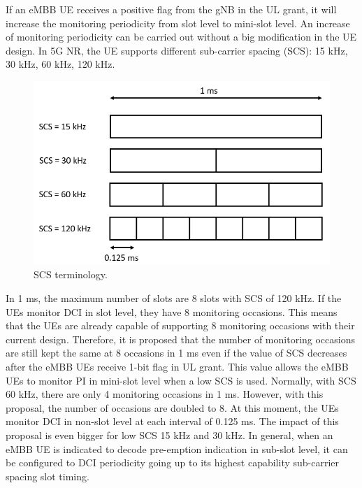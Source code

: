 \documentclass{ieeeaccess}
\begin{document}
If an eMBB UE receives a positive flag from the gNB in the UL grant, it will increase the monitoring periodicity from slot level to mini-slot level. An increase of monitoring periodicity can be carried out without a big modification in the UE design. In 5G NR, the UE supports different sub-carrier spacing (SCS): 15 kHz, 30 kHz, 60 kHz, 120 kHz. 

\begin{figure}[htbp]
\centerline{\includegraphics[scale=0.3]{fig9.PNG}}
\caption{SCS terminology.}
\label{fig9}
\vspace{-2mm}
\end{figure}

In 1 ms, the maximum number of slots are 8 slots with SCS of 120 kHz. If the UEs monitor DCI in slot level, they have 8 monitoring occasions. This means that the UEs are already capable of supporting 8 monitoring occasions with their current design. Therefore, it is proposed that the number of monitoring occasions are still kept the same at 8 occasions in 1 ms even if the value of SCS decreases after the eMBB UEs receive 1-bit flag in UL grant. This value allows the eMBB UEs to monitor PI in mini-slot level when a low SCS is used. Normally, with SCS 60 kHz, there are only 4 monitoring occasions in 1 ms. However, with this proposal, the number of occasions are doubled to 8. At this moment, the UEs monitor DCI in non-slot level at each interval of 0.125 ms. The impact of this proposal is even bigger for low SCS 15 kHz and 30 kHz. In general, when an eMBB UE is indicated to decode pre-emption indication in sub-slot level, it can be configured to DCI periodicity going up to its highest capability sub-carrier spacing slot timing. 
\end{document}
